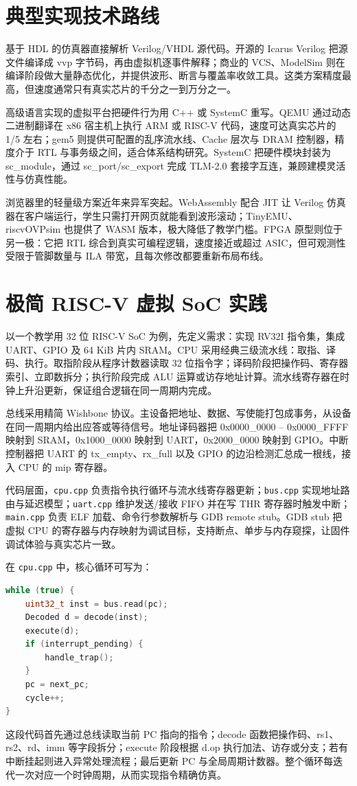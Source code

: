 \chapter{典型实现技术路线}
基于 HDL 的仿真器直接解析 Verilog/VHDL 源代码。开源的 Icarus Verilog 把源文件编译成 vvp 字节码，再由虚拟机逐事件解释；商业的 VCS、ModelSim 则在编译阶段做大量静态优化，并提供波形、断言与覆盖率收敛工具。这类方案精度最高，但速度通常只有真实芯片的千分之一到万分之一。\par
高级语言实现的虚拟平台把硬件行为用 C++ 或 SystemC 重写。QEMU 通过动态二进制翻译在 x86 宿主机上执行 ARM 或 RISC-V 代码，速度可达真实芯片的 1/5 左右；gem5 则提供可配置的乱序流水线、Cache 层次与 DRAM 控制器，精度介于 RTL 与事务级之间，适合体系结构研究。SystemC 把硬件模块封装为 sc\_{}module，通过 sc\_{}port/sc\_{}export 完成 TLM-2.0 套接字互连，兼顾建模灵活性与仿真性能。\par
浏览器里的轻量级方案近年来异军突起。WebAssembly 配合 JIT 让 Verilog 仿真器在客户端运行，学生只需打开网页就能看到波形滚动；TinyEMU、riscvOVPsim 也提供了 WASM 版本，极大降低了教学门槛。FPGA 原型则位于另一极：它把 RTL 综合到真实可编程逻辑，速度接近或超过 ASIC，但可观测性受限于管脚数量与 ILA 带宽，且每次修改都要重新布局布线。\par
\chapter{极简 RISC-V 虚拟 SoC 实践}
以一个教学用 32 位 RISC-V SoC 为例，先定义需求：实现 RV32I 指令集，集成 UART、GPIO 及 64 KiB 片内 SRAM。CPU 采用经典三级流水线：取指、译码、执行。取指阶段从程序计数器读取 32 位指令字；译码阶段把操作码、寄存器索引、立即数拆分；执行阶段完成 ALU 运算或访存地址计算。流水线寄存器在时钟上升沿更新，保证组合逻辑在同一周期内完成。\par
总线采用精简 Wishbone 协议。主设备把地址、数据、写使能打包成事务，从设备在同一周期内给出应答或等待信号。地址译码器把 0x0000\_{}0000 – 0x0000\_{}FFFF 映射到 SRAM，0x1000\_{}0000 映射到 UART，0x2000\_{}0000 映射到 GPIO。中断控制器把 UART 的 tx\_{}empty、rx\_{}full 以及 GPIO 的边沿检测汇总成一根线，接入 CPU 的 mip 寄存器。\par
代码层面，\texttt{cpu.cpp} 负责指令执行循环与流水线寄存器更新；\texttt{bus.cpp} 实现地址路由与延迟模型；\texttt{uart.cpp} 维护发送/接收 FIFO 并在写 THR 寄存器时触发中断；\texttt{main.cpp} 负责 ELF 加载、命令行参数解析与 GDB remote stub。GDB stub 把虚拟 CPU 的寄存器与内存映射为调试目标，支持断点、单步与内存窥探，让固件调试体验与真实芯片一致。\par
在 \texttt{cpu.cpp} 中，核心循环可写为：\par
\begin{lstlisting}[language=cpp]
while (true) {
    uint32_t inst = bus.read(pc);
    Decoded d = decode(inst);
    execute(d);
    if (interrupt_pending) {
        handle_trap();
    }
    pc = next_pc;
    cycle++;
}
\end{lstlisting}
这段代码首先通过总线读取当前 PC 指向的指令；decode 函数把操作码、rs1、rs2、rd、imm 等字段拆分；execute 阶段根据 d.op 执行加法、访存或分支；若有中断挂起则进入异常处理流程；最后更新 PC 与全局周期计数器。整个循环每迭代一次对应一个时钟周期，从而实现指令精确仿真。\par
